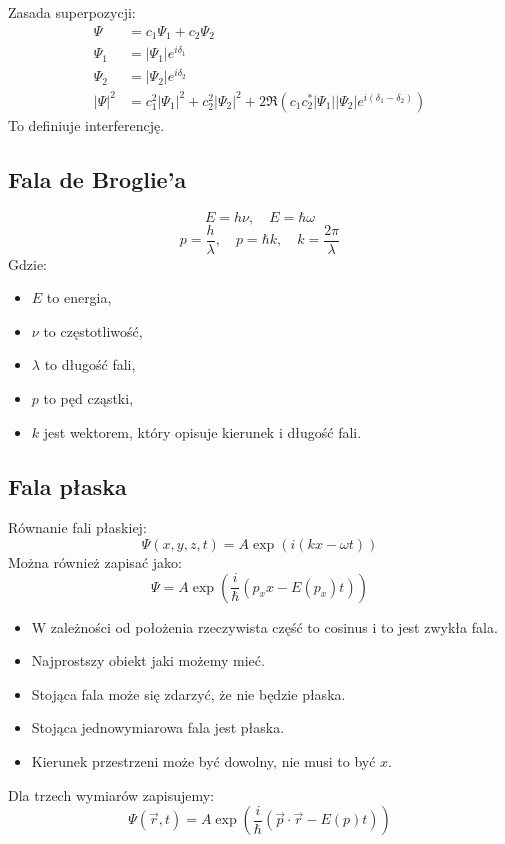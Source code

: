 Zasada superpozycji:
\begin{align*}
\Psi &= c_1 \Psi_1 + c_2 \Psi_2\\
\Psi_1 &= |\Psi_1| e^{i \delta_1}\\
\Psi_2 &= |\Psi_2| e^{i \delta_2}\\
|\Psi|^2 &= c_1^2 |\Psi_1|^2 + c_2^2 |\Psi_2|^2 + 2 \Re (c_1 c_2^* |\Psi_1| |\Psi_2| e^{i (\delta_1 - \delta_2)})
\end{align*}
To definiuje interferencję.

\subsection{Fala de Broglie'a}
\[
E = h\nu, \quad E = \hbar \omega
\]
\[
p = \frac{h}{\lambda}, \quad p = \hbar k, \quad k = \frac{2\pi}{\lambda}
\]
Gdzie:
\begin{itemize}
    \item $E$ to energia,
    \item $\nu$ to częstotliwość,
    \item $\lambda$ to długość fali,
    \item $p$ to pęd cząstki,
    \item $k$ jest wektorem, który opisuje kierunek i długość fali.
\end{itemize}

\subsection{Fala płaska}
Równanie fali płaskiej:
\[
\Psi(x,y,z,t) = A \exp \left( i \left( kx - \omega t \right) \right)
\]
Można również zapisać jako:
\[
\Psi = A \exp \left( \frac{i}{\hbar} (p_x x - E(p_x) t) \right)
\]
\begin{itemize}
    \item W zależności od położenia rzeczywista część to cosinus i to jest zwykła fala.
    \item Najprostszy obiekt jaki możemy mieć.
    \item Stojąca fala może się zdarzyć, że nie będzie płaska.
    \item Stojąca jednowymiarowa fala jest płaska.
    \item Kierunek przestrzeni może być dowolny, nie musi to być $x$.
\end{itemize}

Dla trzech wymiarów zapisujemy:
\[
\Psi(\vec{r}, t) = A \exp \left( \frac{i}{\hbar} (\vec{p} \cdot \vec{r} - E(p) t) \right)
\]

